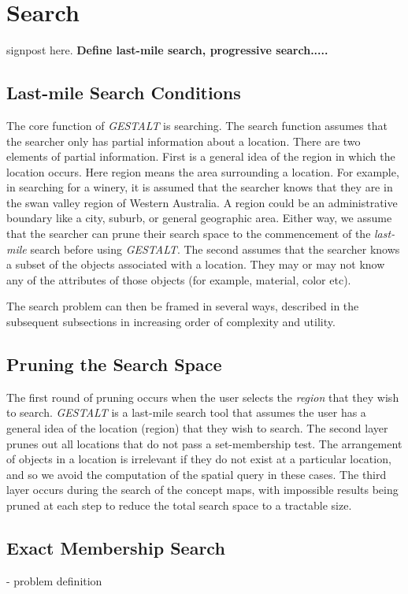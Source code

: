 \section{Search}
\label{section:search}

signpost here. \textbf{Define last-mile search, progressive search.....}

\subsection{Last-mile Search Conditions}
The core function of \textit{GESTALT} is searching. The search function assumes that the searcher only has partial information about a location. 
There are two elements of partial information. 
First is a general idea of the region in which the location occurs. Here region means the area surrounding a location. 
For example, in searching for a winery, it is assumed that the searcher knows that they are in the swan valley region of Western Australia. A region could be an administrative boundary like a city, suburb, or general geographic area. 
Either way, we assume that the searcher can prune their search space to the commencement of the \textit{last-mile} search before using \textit{GESTALT}.
The second assumes that the searcher knows a subset of the objects associated with a location. They may or may not know any of the attributes of those objects (for example, material, color etc). 


The search problem can then be framed in several ways, described in the subsequent subsections in increasing order of complexity and utility.

\subsection{Pruning the Search Space}
The first round of pruning occurs when the user selects the \emph{region} that they wish to search. 
\emph{GESTALT} is a last-mile search tool that assumes the user has a general idea of the location (region) that they wish to search. 
The second layer prunes out all locations that do not pass a set-membership test. The arrangement of objects in a location is irrelevant if they do not exist at a particular location, and so we avoid the computation of the spatial query in these cases. 
The third layer occurs during the search of the concept maps, with impossible results being pruned at each step to reduce the total search space to a tractable size.


\subsection{Exact Membership Search}
- problem definition

